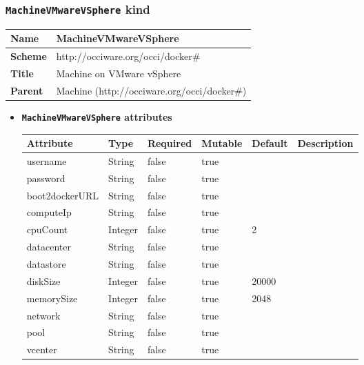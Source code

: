 \subsubsection{\texttt{MachineVMwareVSphere} kind}
\begin{center}
\begin{tabular}{|l|l|}
  \hline
  \textbf{Name} & MachineVMwareVSphere \\
  \hline  
  \textbf{Scheme} & http://occiware.org/occi/docker\# \\
  \hline
  \textbf{Title} & Machine on VMware vSphere \\
  \hline
  \textbf{Parent} & Machine (http://occiware.org/occi/docker\#) \\
  \hline
\end{tabular}
\end{center}
\begin{itemize}
\item \textbf{\texttt{MachineVMwareVSphere} attributes}

\begin{tabularx}{\textwidth}{|l|l|p{1.4cm}|p{1.3cm}|l|X|}
  \hline
  \textbf{Attribute} & \textbf{Type} & \textbf{Required} & \textbf{Mutable} & \textbf{Default} & \textbf{Description} \\
  \hline  
  username & String & false & true &  &  \\
  \hline
  password & String & false & true &  &  \\
  \hline
  boot2dockerURL & String & false & true &  &  \\
  \hline
  computeIp & String & false & true &  &  \\
  \hline
  cpuCount & Integer & false & true & 2 &  \\
  \hline
  datacenter & String & false & true &  &  \\
  \hline
  datastore & String & false & true &  &  \\
  \hline
  diskSize & Integer & false & true & 20000 &  \\
  \hline
  memorySize & Integer & false & true & 2048 &  \\
  \hline
  network & String & false & true &  &  \\
  \hline
  pool & String & false & true &  &  \\
  \hline
  vcenter & String & false & true &  &  \\
  \hline
\end{tabularx}
\end{itemize}



